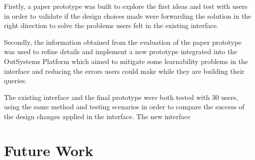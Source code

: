 Firstly, a paper prototype was built to explore the first ideas and test with users in order to validate if the design choices made were forwarding the solution in the right direction to solve the problems users felt in the existing interface.

Secondly, the information obtained from the evaluation of the paper prototype was used to refine details and implement a new prototype integrated into the OutSystems Platform which aimed to mitigate some learnability problems in the interface and reducing the errors users could make while they are building their queries.

The existing interface and the final prototype were both tested with 30 users, using the same method and testing scenarios in order to compare the success of the design changes applied in the interface. The new interface 


\section{Future Work}
\label{sec:future_work}

